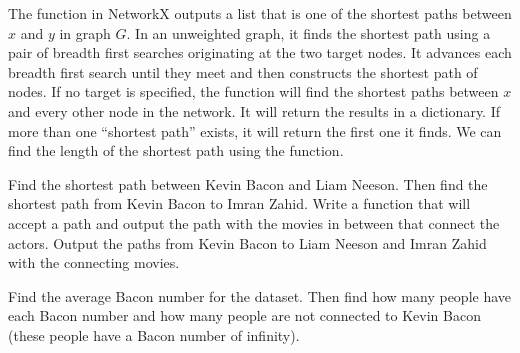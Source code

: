 The  function in NetworkX outputs a list that is one of the shortest paths between $x$ and $y$ in graph $G$.  In an unweighted graph, it finds the shortest path using a pair of breadth first searches originating at the two target nodes.  It advances each breadth first search until they meet and then  constructs the shortest path of nodes.  If no target is specified, the function will find the shortest paths between $x$ and every other node in the network.  It will return the results in a dictionary.  If more than one ``shortest path'' exists, it will return the first one it finds.  We can find the length of the shortest path using the  function.

\begin{problem}
Find the shortest path between Kevin Bacon and Liam Neeson. Then find the shortest path from Kevin Bacon to Imran Zahid. Write a function that will accept a path and output the path with the movies in between that connect the actors. Output the paths from Kevin Bacon to Liam Neeson and Imran Zahid with the connecting movies.
\end{problem}

\begin{problem}
Find the average Bacon number for the dataset. Then find how many people have each Bacon number and how many people are not connected to Kevin Bacon (these people have a Bacon number of infinity).
\end{problem}

